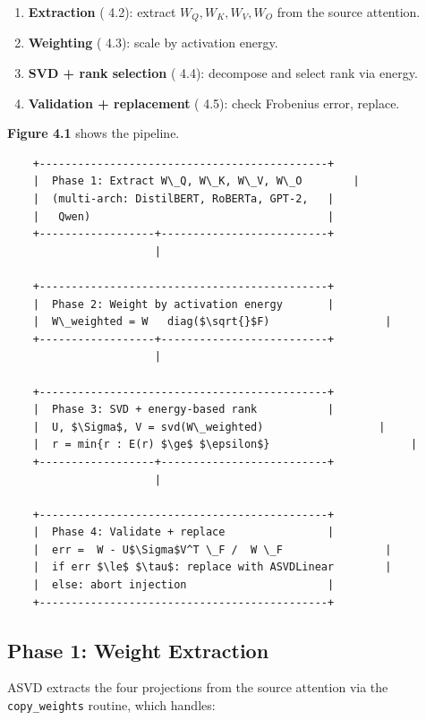 \begin{enumerate}
\item \textbf{Extraction} ( 4.2): extract $W_Q, W_K, W_V, W_O$ from the source
  attention.
\item \textbf{Weighting} ( 4.3): scale by activation energy.
\item \textbf{SVD + rank selection} ( 4.4): decompose and select rank via energy.
\item \textbf{Validation + replacement} ( 4.5): check Frobenius error, replace.

\end{enumerate}
\textbf{Figure 4.1} shows the pipeline.

\begin{lstlisting}
    +---------------------------------------------+
    |  Phase 1: Extract W\_Q, W\_K, W\_V, W\_O        |
    |  (multi-arch: DistilBERT, RoBERTa, GPT-2,   |
    |   Qwen)                                     |
    +------------------+--------------------------+
                       |
                        
    +---------------------------------------------+
    |  Phase 2: Weight by activation energy       |
    |  W\_weighted = W   diag($\sqrt{}$F)                  |
    +------------------+--------------------------+
                       |
                        
    +---------------------------------------------+
    |  Phase 3: SVD + energy-based rank           |
    |  U, $\Sigma$, V = svd(W\_weighted)                  |
    |  r = min{r : E(r) $\ge$ $\epsilon$}                      |
    +------------------+--------------------------+
                       |
                        
    +---------------------------------------------+
    |  Phase 4: Validate + replace                |
    |  err =  W - U$\Sigma$V^T \_F /  W \_F                |
    |  if err $\le$ $\tau$: replace with ASVDLinear        |
    |  else: abort injection                      |
    +---------------------------------------------+
\end{lstlisting}

\subsection{Phase 1: Weight Extraction}

ASVD extracts the four projections from the source attention via the 
\texttt{copy\_weights} routine, which handles:

